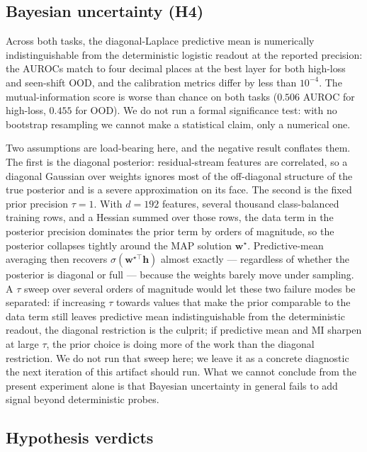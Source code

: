 \documentclass[11pt]{article}
\begin{document}
\subsection{Bayesian uncertainty (H4)}\label{sec:bayesian}

Across both tasks, the diagonal-Laplace predictive mean is numerically indistinguishable from the deterministic logistic readout at the reported precision: the AUROCs match to four decimal places at the best layer for both high-loss and seen-shift OOD, and the calibration metrics differ by less than $10^{-4}$. The mutual-information score is worse than chance on both tasks ($0.506$ AUROC for high-loss, $0.455$ for OOD). We do not run a formal significance test: with no bootstrap resampling we cannot make a statistical claim, only a numerical one.

Two assumptions are load-bearing here, and the negative result conflates them. The first is the diagonal posterior: residual-stream features are correlated, so a diagonal Gaussian over weights ignores most of the off-diagonal structure of the true posterior and is a severe approximation on its face. The second is the fixed prior precision $\tau=1$. With $d=192$ features, several thousand class-balanced training rows, and a Hessian summed over those rows, the data term in the posterior precision dominates the prior term by orders of magnitude, so the posterior collapses tightly around the MAP solution $\mathbf{w}^\star$. Predictive-mean averaging then recovers $\sigma(\mathbf{w}^{\star\top}\mathbf{h})$ almost exactly --- regardless of whether the posterior is diagonal or full --- because the weights barely move under sampling. A $\tau$ sweep over several orders of magnitude would let these two failure modes be separated: if increasing $\tau$ towards values that make the prior comparable to the data term still leaves predictive mean indistinguishable from the deterministic readout, the diagonal restriction is the culprit; if predictive mean and MI sharpen at large $\tau$, the prior choice is doing more of the work than the diagonal restriction. We do not run that sweep here; we leave it as a concrete diagnostic the next iteration of this artifact should run. What we cannot conclude from the present experiment alone is that Bayesian uncertainty in general fails to add signal beyond deterministic probes.

\subsection{Hypothesis verdicts}
\end{document}
